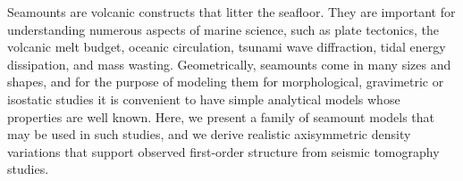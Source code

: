 Seamounts are volcanic constructs that litter the seafloor.
They are important for understanding numerous aspects of marine science, such as
plate tectonics, the volcanic melt budget, oceanic circulation, tsunami wave diffraction,
tidal energy dissipation, and mass wasting. Geometrically, seamounts come in many sizes and shapes,
and for the purpose of modeling them for morphological, gravimetric or isostatic studies
it is convenient to have simple analytical models whose properties are well known.  Here,
we present a family of seamount models that may be used in such studies, and we derive
realistic axisymmetric density variations that support observed first-order structure
from seismic tomography studies.
